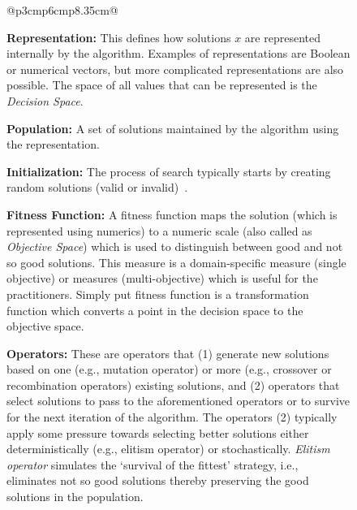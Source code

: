 \documentclass[sigconf]{acmart}
\begin{document}
\begin{figure}
{\begin{tabular}{@{}p{3cm}p{6cm}p{8.35cm}@{}}
{\begin{minipage}[b]{\linewidth}
                \textbf{Representation: } {This defines how solutions $x$ are represented internally by the algorithm.
                Examples of representations are Boolean or numerical vectors, but more complicated representations are also possible. The space of all values that can be represented is the} \textit{Decision Space}.
                
                \textbf{Population: } A set of solutions maintained by the algorithm using the representation.
                
                \textbf{Initialization: } The process of search {typically} starts by creating random solutions (valid or invalid)~\cite{saber2017seeding, chen2017beyond, chen2017sampling, henard2015combining}.
                
                \textbf{Fitness Function: } A fitness function maps the solution (which is represented using numerics) to a numeric scale (also called as \textit{Objective Space}) which is used to distinguish between good and not so good solutions. This measure is a domain-specific measure (single objective) or measures (multi-objective) which is useful for the practitioners.
                Simply put fitness function is a transformation function which converts a point in the decision space to the objective space. 
                
                \textbf{Operators: } {These are operators that (1) generate new solutions based on one (e.g., mutation operator) or more (e.g., crossover or recombination operators) existing solutions, and (2) operators that select solutions to pass to the aforementioned operators or to survive for the next iteration of the algorithm. The operators (2) typically apply some pressure towards selecting better solutions either deterministically (e.g., elitism operator) or stochastically.} 
                \textit{Elitism operator} simulates the `survival of the fittest' strategy, i.e., eliminates not so good solutions thereby preserving the good solutions in the population. 
                

\end{minipage}}
\end{tabular}}
\end{figure}
\end{document}
